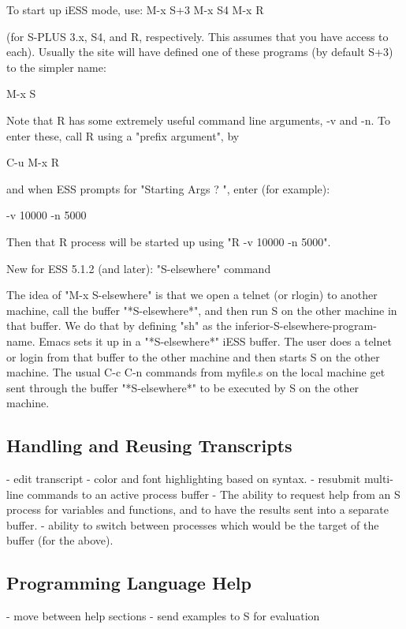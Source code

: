 \documentclass{article}
\begin{document}
To start up iESS mode, use:
   M-x S+3 
   M-x S4
   M-x R

(for S-PLUS 3.x, S4, and R, respectively.  This assumes that you have
access to each).  Usually the site will have defined one of these programs
(by default S+3) to the simpler name:

   M-x S

Note that R has some extremely useful command line arguments, 
-v and -n.   To enter these, call R using a "prefix argument", by

   C-u M-x R

and when ESS prompts for "Starting Args ? ", enter (for example):

   -v 10000 -n 5000

Then that R process will be started up using "R -v 10000 -n 5000".

New for ESS 5.1.2 (and later):  "S-elsewhere" command

  The idea of "M-x S-elsewhere" is that we open a telnet (or rlogin)
  to another machine, call the buffer "*S-elsewhere*", and then run S
  on the other machine in that buffer.  We do that by defining "sh" as
  the inferior-S-elsewhere-program-name.  Emacs sets it up in a
  "*S-elsewhere*" iESS buffer.  The user does a telnet or login from
  that buffer to the other machine and then starts S on the other
  machine.  The usual C-c C-n commands from myfile.s on the local
  machine get sent through the buffer "*S-elsewhere*" to be executed
  by S on the other machine.
                           

\subsection{Handling and Reusing Transcripts}
\label{sec:basic:trans}

- edit transcript
- color and font highlighting based on syntax.
- resubmit multi-line commands to an active process buffer
- The ability to request help from an S process for variables and
  functions, and to have the results sent into a separate buffer.
- ability to switch between processes which would be the target of the 
  buffer (for the above).


\subsection{Programming Language Help}
\label{sec:basic:help}


- move between help sections
- send examples to S for evaluation
\end{document}
